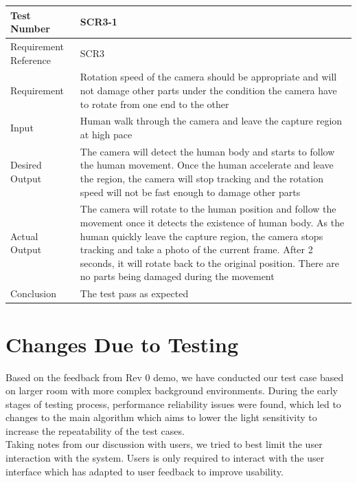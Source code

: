 \documentclass[12pt, titlepage]{article}
\begin{document}
\begin{table}[H]
\begin{center}
\begin{tabular}{|l | m{9cm}|}
\hline
  Test Number & SCR3-1\\
  \hline
  Requirement Reference & SCR3\\
  \hline
  Requirement &  Rotation speed of the camera should be appropriate and will not damage other parts under the condition the camera have to rotate from one end to the other\\
  \hline
  Input & Human walk through the camera and leave the capture region at high pace\\
  \hline
  Desired Output & The camera will detect the human body and starts to follow the human movement. Once the human accelerate and leave the region, the camera will stop tracking and the rotation speed will not be fast enough to damage other parts\\
  \hline
  Actual Output & The camera will rotate to the human position and follow the movement once it detects the existence of human body. As the human quickly leave the capture region, the camera stops tracking and take a photo of the current frame. After 2 seconds, it will rotate back to the original position. There are no parts being damaged during the movement \\
  \hline
  Conclusion & The test pass as expected\\
  \hline
\end{tabular}
\end{center}           
\end{table}
\section{Changes Due to Testing}
Based on the feedback from Rev 0 demo, we have conducted our test case based on larger room with more complex background environments. During the early stages of testing process, performance reliability issues were found, which led to changes to the main algorithm which aims to lower the light sensitivity to increase the repeatability of the test cases.  \\
 
 Taking notes from our discussion with users, we tried to best limit the user interaction with the system. Users is only required to interact with the user interface which has adapted to user feedback to improve usability. \\
 
\end{document}
